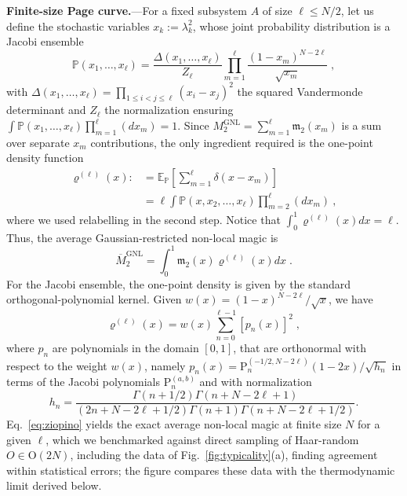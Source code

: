 \documentclass[aps,prl,twocolumn,superscriptaddress,reprint,longbibliography,nofootinbib]{revtex4-2}
\begin{document}
\textbf{Finite-size Page curve.}---For a fixed subsystem $A$ of size $\ell\le N/2$, let us define the stochastic variables $x_k:=\lambda_k^2$, whose joint probability distribution is a Jacobi ensemble~\cite{Mehta2004,PhysRevB.103.L241118}
\begin{equation}
    \mathbb{P}(x_1,\dots,x_\ell) = \frac{\Delta(x_1,\dots,x_\ell)}{Z_\ell}  \prod_{m=1}^\ell \frac{(1-x_m)^{N-2\ell}}{\sqrt{x_m}}\;,
\end{equation}
with $\Delta(x_1,\dots,x_\ell)=\prod_{1\le i<j\le \ell} (x_i-x_j)^2$ the squared Vandermonde determinant  and $Z_\ell$ the normalization ensuring $\int \mathbb{P}(x_1,\dots,x_\ell)\prod_{m=1}^\ell (dx_m)=1$.
Since $M_2^\mathrm{GNL}=\sum_{m=1}^\ell \mathfrak{m}_2(x_m)$ is a sum over separate $x_m$ contributions, the only ingredient required is the one-point density function
\begin{equation}
\begin{split}
    \varrho^{(\ell)}(x):&=\mathbb{E}_\mathbb{P}\left[\sum_{m=1}^\ell \delta(x-x_m)\right] \\&= \ell \int \mathbb{P}(x,x_2,\dots,x_\ell)\prod_{m=2}^\ell (dx_m)\:,
\end{split}
\end{equation}
where we used relabelling in the second step. Notice that $\int_0^1 \varrho^{(\ell)}(x) dx = \ell$.
Thus, the average Gaussian-restricted non-local magic is
\begin{equation}
    \overline{M}_2^\mathrm{GNL}=\int_0^1 \mathfrak{m}_2(x) \varrho^{(\ell)}(x) dx\;.
\end{equation}
For the Jacobi ensemble, the one-point density is given by the standard orthogonal-polynomial kernel.
Given $w(x) = (1-x)^{N-2\ell}/\sqrt{x}$, we have~\cite{sierant2026theorymatchgatecommutant,sierant2026fermionic}
\begin{equation}
\varrho^{(\ell)}(x) = w(x) \sum_{n=0}^{\ell-1} [p_n(x)]^2\;,
\label{eq:ziopino}
\end{equation}
where $p_n$ are polynomials in the domain $[0,1]$, that are orthonormal with respect to the weight $w(x)$, namely $p_n(x) = \mathrm{P}_n^{(-1/2,N-2\ell)}(1-2x)/\sqrt{h_n}$ in terms of the Jacobi polynomials $\mathrm{P}_n^{(a,b)}$ and with normalization
\begin{equation}
    h_n=\frac{\Gamma(n+1/2) \Gamma(n+N-2\ell+1)}{(2n+N-2\ell+1/2) \Gamma(n+1)\Gamma(n+N-2\ell+1/2)}.
\end{equation}
Eq.~\eqref{eq:ziopino} yields the exact average non-local magic at finite size $N$ for a given $\ell$, which we benchmarked against direct sampling of Haar-random $O\in\mathrm{O}(2N)$, including the data of Fig.~\ref{fig:typicality}(a), finding agreement within statistical errors; the figure compares these data with the thermodynamic limit derived below.
\end{document}
